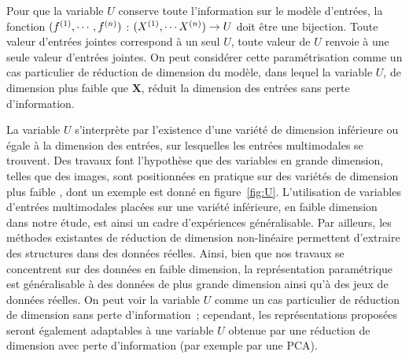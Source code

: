 \documentclass[../main]{subfiles}
\begin{document}
Pour que la variable $U$ conserve toute l'information sur le modèle d'entrées, la fonction $(f^{({1})}, \cdots, f^{({n})})$ : $(X^{({1})}, \cdots X^{({n})})\rightarrow U$ doit être une bijection. Toute valeur d'entrées jointes correspond à un seul $U$, toute valeur de $U$ renvoie à une seule valeur d'entrées jointes. 
On peut considérer cette paramétrisation comme un cas particulier de réduction de dimension du modèle, dans lequel la variable $U$, de dimension plus faible que $\mathbf{X}$, réduit la dimension des entrées sans perte d'information.

La variable $U$ s'interprète par l'existence d'une variété de dimension inférieure ou égale à la dimension des entrées, sur lesquelles les entrées multimodales se trouvent.
Des travaux font l'hypothèse que des variables en grande dimension, telles que des images, sont positionnées en pratique sur des variétés de dimension plus faible \cite{Pless2009ASO}, dont un exemple est donné en figure~\ref{fig:U}.
L'utilisation de variables d'entrées multimodales placées sur une variété inférieure, en faible dimension dans notre étude, est ainsi un cadre d'expériences généralisable.
Par ailleurs, les méthodes existantes de réduction de dimension non-linéaire permettent d'extraire des structures dans des données réelles. 
Ainsi, bien que nos travaux se concentrent sur des données en faible dimension, la représentation paramétrique est généralisable à des données de plus grande dimension ainsi qu'à des jeux de données réelles. 
On peut voir la variable $U$ comme un cas particulier de réduction de dimension sans perte d'information~; cependant, les représentations proposées seront également adaptables à une variable $U$ obtenue par une réduction de dimension avec perte d'information (par exemple par une PCA). 
\end{document}
